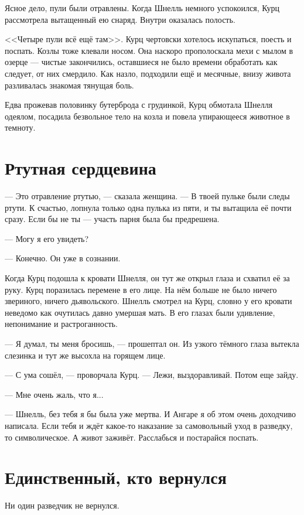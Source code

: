 \documentclass[a4paper,10pt,fleqn]{book}\usepackage{polyglossia}\setdefaultlanguage{english}\setotherlanguage{russian}\defaultfontfeatures{Ligatures=TeX,Mapping=tex-text}\usepackage{xcolor}\definecolor{lightgray}{HTML}{bbbbbb}\color{lightgray}\newcommand{\ml}[3]{\textcolor{black}{#3}}
\begin{document}
Ясное дело, пули были отравлены.
Когда Шнелль немного успокоился, Курц рассмотрела вытащенный ею снаряд.
Внутри оказалась полость.

<<Четыре пули всё ещё там>>.
Курц чертовски хотелось искупаться, поесть и поспать.
Козлы тоже клевали носом.
Она наскоро прополоскала мехи с мылом в озерце --- чистые закончились, оставшиеся не было времени обработать как следует, от них смердило.
Как назло, подходили ещё и месячные, внизу живота разливалась знакомая тянущая боль.

Едва прожевав половинку бутерброда с грудинкой, Курц обмотала Шнелля одеялом, посадила безвольное тело на козла и повела упирающееся животное в темноту.

\section{Ртутная сердцевина}

--- Это отравление ртутью, --- сказала женщина.
--- В твоей пульке были следы ртути.
К счастью, лопнула только одна пулька из пяти, и ты вытащила её почти сразу.
Если бы не ты --- участь парня была бы предрешена.

--- Могу я его увидеть?

--- Конечно.
Он уже в сознании.

Когда Курц подошла к кровати Шнелля, он тут же открыл глаза и схватил её за руку.
Курц поразилась перемене в его лице.
На нём больше не было ничего звериного, ничего дьявольского.
Шнелль смотрел на Курц, словно у его кровати неведомо как очутилась давно умершая мать.
В его глазах были удивление, непонимание и растроганность.

--- Я думал, ты меня бросишь, --- прошептал он.
Из узкого тёмного глаза вытекла слезинка и тут же высохла на горящем лице.

--- С ума сошёл, --- проворчала Курц.
--- Лежи, выздоравливай.
Потом еще зайду.

--- Мне очень жаль, что я...

--- Шнелль, без тебя я бы была уже мертва.
И Ангаре я об этом очень доходчиво написала.
Если тебя и ждёт какое-то наказание за самовольный уход в разведку, то символическое.
А живот заживёт.
Расслабься и постарайся поспать.

\section{Единственный, кто вернулся}

Ни один разведчик не вернулся.
\end{document}
